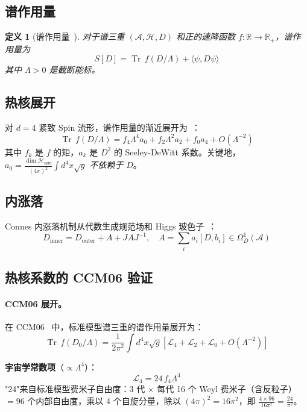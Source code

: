 \documentclass[11pt,a4paper]{ctexart}
\newtheorem{definition}[theorem]{定义}
\theoremstyle{remark}
\providecommand{\Tr}{\operatorname{Tr}}
\begin{document}
\subsection{谱作用量}

\begin{definition}[谱作用量~\cite{CC96}]
对于谱三重 $(\mathcal{A}, \mathcal{H}, D)$ 和正的速降函数 $f: \mathbb{R} \to \mathbb{R}_+$，谱作用量为
\[
  S[D] = \Tr\, f(D/\Lambda) + \langle\psi, D\psi\rangle
\]
其中 $\Lambda > 0$ 是截断能标。
\end{definition}

\subsection{热核展开}

对 $d=4$ 紧致 Spin 流形，谱作用量的渐近展开为~\cite{CC96, Vas03}：
\[
  \Tr\, f(D/\Lambda) = f_4 \Lambda^4 a_0 + f_2 \Lambda^2 a_2 + f_0 a_4 + O(\Lambda^{-2})
\]
其中 $f_k$ 是 $f$ 的矩，$a_k$ 是 $D^2$ 的 Seeley-DeWitt 系数。关键地，$a_0 = \frac{\dim\mathcal{H}_{\mathrm{spin}}}{(4\pi)^2} \int d^4x\sqrt{g}$ \emph{不依赖于 $D$}。

\subsection{内涨落}

Connes 内涨落机制从代数生成规范场和 Higgs 玻色子~\cite{Con94, CCM06}：
\[
  D_{\mathrm{inner}} = D_{\mathrm{outer}} + A + JAJ^{-1}, \quad A = \sum_i a_i [D, b_i] \in \Omega^1_D(\mathcal{A})
\]

\subsection{热核系数的 CCM06 验证}
\label{sec:heatkernel}

\paragraph{CCM06 展开。}
在 CCM06~\cite{CCM06} 中，标准模型谱三重的谱作用量展开为：
\[
  \Tr\, f(D_0/\Lambda) = \frac{1}{2\pi^2} \int d^4x\sqrt{g}\left[\mathcal{L}_4 + \mathcal{L}_2 + \mathcal{L}_0 + O(\Lambda^{-2})\right]
\]

\textbf{宇宙学常数项}（$\propto \Lambda^4$）：
\[
  \mathcal{L}_4 = 24\, f_4 \Lambda^4
\]
"24"来自标准模型费米子自由度：3 代 $\times$ 每代 16 个 Weyl 费米子（含反粒子）$= 96$ 个内部自由度，乘以 4 个自旋分量，除以 $(4\pi)^2 = 16\pi^2$，即 $\frac{4 \times 96}{16\pi^2} = \frac{24}{\pi^2}$。
\end{document}
